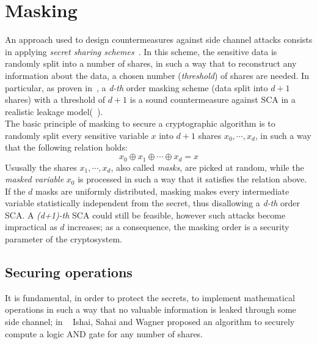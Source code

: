 \section{Masking}
An approach used to design countermeasures against side channel attacks consists in applying \textit{secret sharing schemes}~\cite{shamir1979share}. 
In this scheme, the sensitive data is randomly split into a number of shares, in such a way that to reconstruct any information about the data, a chosen number (\textit{threshold}) of shares are needed.
In particular, as proven in~\cite{chari1999towards}, a \textit{d-th} order masking scheme (data split into $d+1$ shares) with a threshold of $d+1$ is a sound countermeasure against SCA in a realistic leakage model(~\cite{ishai2003private}).\\
The basic principle of masking to secure a cryptographic algorithm is to randomly split every sensitive variable $x$ into $d+1$ shares $x_0, \cdots, x_d$, in such a way that the following relation holds:
\begin{equation*}
x_0 \oplus x_1 \oplus \cdots \oplus x_d = x
\end{equation*}
Ususally the shares $x_1, \cdots, x_d$, also called \textit{masks}, are picked at random, while the \textit{masked variable} $x_0$ is processed in such a way that it satisfies the relation above.
If the $d$ masks are uniformly distributed, masking makes every intermediate variable statistically independent from the secret, thus disallowing a \textit{d-th} order SCA.
A \textit{(d+1)-th} SCA could still be feasible, however such attacks become impractical as $d$ increases; as a consequence, the masking order is a security parameter of the cryptosystem.

\subsection*{\textbf{Securing operations}}
It is fundamental, in order to protect the secrets, to implement mathematical operations in such a way that no valuable information is leaked through some side channel; in ~\cite{ishai2003private} Ishai, Sahai and Wagner proposed an algorithm to securely compute a logic AND gate for any number of shares.

